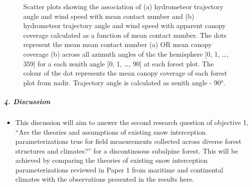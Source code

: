 \documentclass[
  letterpaper,
  DIV=11,
  numbers=noendperiod]{scrartcl}
\let\oldsubparagraph\subparagraph
\renewcommand{\subparagraph}[1]{\oldsubparagraph{#1}\mbox{}}
\providecommand{\tightlist}{%
  \setlength{\itemsep}{0pt}\setlength{\parskip}{0pt}}\usepackage{longtable,booktabs,array}
\begin{document}
\begin{figure}

\begin{minipage}{\linewidth}


\subcaption{\label{fig-ht-cc}}

\end{minipage}%
\newline
\begin{minipage}{\linewidth}


\subcaption{\label{fig-ht-cc}}

\end{minipage}%

\caption{\label{fig-ta-ws-cc}Scatter plots showing the association of
(a) hydrometeor trajectory angle and wind speed with mean contact number
and (b) hydrometeor trajectory angle and wind speed with apparent canopy
coverage calculated as a function of mean contact number. The dots
represent the mean mean contact number (a) OR mean canopy coverage (b)
across all azimuth angles of the the hemisphere {[}0, 1, \ldots, 359{]}
for a each zenith angle {[}0, 1, \ldots, 90{]} at each forest plot. The
colour of the dot represents the mean canopy coverage of each forest
plot from nadir. Trajectory angle is calculated as zenith angle - 90°.}

\end{figure}%

\subparagraph{4. Discussion}\label{discussion-1}

\begin{itemize}
\tightlist
\item
  This discussion will aim to answer the second research question of
  objective 1, ``Are the theories and assumptions of existing snow
  interception parameterizations true for field measurements collected
  across diverse forest structures and climates?'' for a discontinuous
  subalpine forest. This will be achieved by comparing the theories of
  existing snow interception parameterizations reviewed in Paper 1 from
  maritime and continental climates with the observations presented in
  the results here.
\end{itemize}
\end{document}
